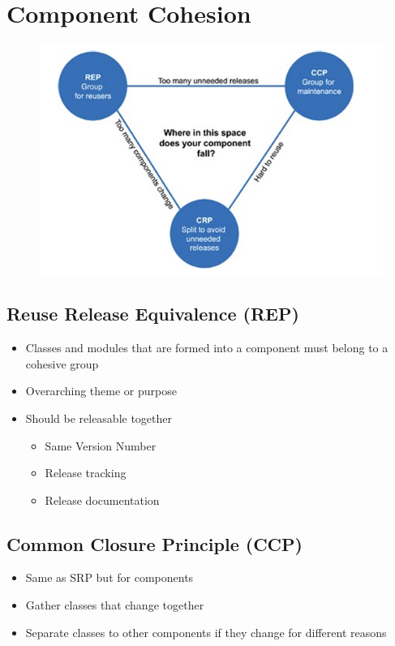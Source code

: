 \documentclass[../Main.tex]{subfiles}
\begin{document}
\section{Component Cohesion}
\begin{figure}[H]
    \centering
    \includegraphics[width=0.75\linewidth]{Images/cleanarch/component-cohesion.png}
\end{figure}

\subsection{Reuse Release Equivalence (REP)}
\begin{itemize}
    \item Classes and modules that are formed into a component must belong to a cohesive group
    \item Overarching theme or purpose
    \item Should be releasable together
          \begin{itemize}
              \item Same Version Number
              \item Release tracking
              \item Release documentation
          \end{itemize}
\end{itemize}

\subsection{Common Closure Principle (CCP)}
\begin{itemize}
    \item Same as SRP but for components
    \item Gather classes that change together
    \item Separate classes to other components if they change for different reasons
\end{itemize}
\end{document}
